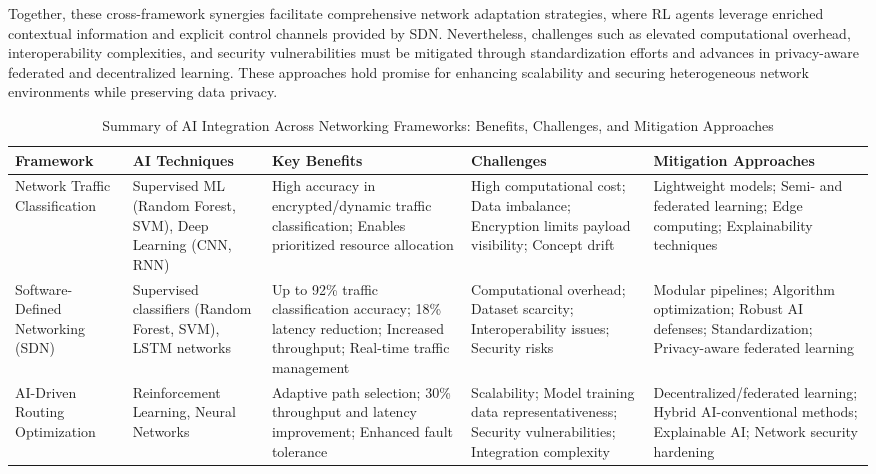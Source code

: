 \documentclass[sigconf]{acmart}
\begin{document}
Together, these cross-framework synergies facilitate comprehensive network adaptation strategies, where RL agents leverage enriched contextual information and explicit control channels provided by SDN. Nevertheless, challenges such as elevated computational overhead, interoperability complexities, and security vulnerabilities must be mitigated through standardization efforts and advances in privacy-aware federated and decentralized learning. These approaches hold promise for enhancing scalability and securing heterogeneous network environments while preserving data privacy.

\begin{table*}[htbp]
\centering
\caption{Summary of AI Integration Across Networking Frameworks: Benefits, Challenges, and Mitigation Approaches}
\label{tab:integration_summary}
\begin{adjustbox}{max width=\textwidth}
\begin{tabular}{@{}lllll@{}}
\toprule
\textbf{Framework} & \textbf{AI Techniques} & \textbf{Key Benefits} & \textbf{Challenges} & \textbf{Mitigation Approaches} \\ \midrule
Network Traffic Classification~\cite{ref51} & Supervised ML (Random Forest, SVM), Deep Learning (CNN, RNN) & 
High accuracy in encrypted/dynamic traffic classification; Enables prioritized resource allocation & 
High computational cost; Data imbalance; Encryption limits payload visibility; Concept drift & 
Lightweight models; Semi- and federated learning; Edge computing; Explainability techniques \\

Software-Defined Networking (SDN)~\cite{ref52} & Supervised classifiers (Random Forest, SVM), LSTM networks & 
Up to 92\% traffic classification accuracy; 18\% latency reduction; Increased throughput; Real-time traffic management & 
Computational overhead; Dataset scarcity; Interoperability issues; Security risks & 
Modular pipelines; Algorithm optimization; Robust AI defenses; Standardization; Privacy-aware federated learning \\

AI-Driven Routing Optimization~\cite{ref53} & Reinforcement Learning, Neural Networks & 
Adaptive path selection; 30\% throughput and latency improvement; Enhanced fault tolerance & 
Scalability; Model training data representativeness; Security vulnerabilities; Integration complexity & 
Decentralized/federated learning; Hybrid AI-conventional methods; Explainable AI; Network security hardening \\ \bottomrule
\end{tabular}
\end{adjustbox}
\end{table*}
\end{document}

